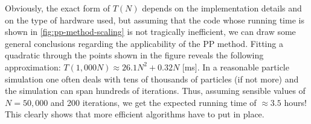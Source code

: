 Obviously, the exact form of $T(N)$ depends on the implementation details and on the type of hardware used, but assuming that the code whose running time is shown in \autoref{fig:pp-method-scaling} is not tragically inefficient, we can draw some general conclusions regarding the applicability of the PP method.
Fitting a quadratic through the points shown in the figure reveals the following approximation: $T(1{,}000N) \approx 26.1N^2 + 0.32N$ [ms].
In a reasonable particle simulation one often deals with tens of thousands of particles (if not more) and the simulation can span hundreds of iterations.
Thus, assuming sensible values of $N = 50{,}000$ and 200 iterations, we get the expected running time of $\approx 3.5$ hours!
This clearly shows that more efficient algorithms have to put in place.
